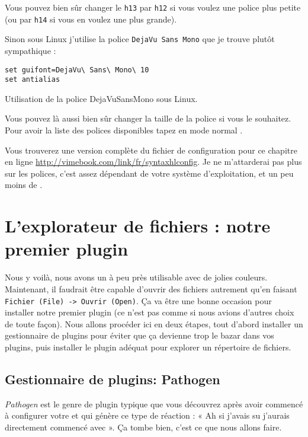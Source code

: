Vous pouvez bien sûr changer le \Verb|h13| par \Verb|h12| si vous voulez une police plus petite (ou par \Verb|h14| si vous en voulez une plus grande).

Sinon sous Linux j'utilise la police \Verb|DejaVu Sans Mono| que je trouve plutôt sympathique :

\begin{listing}[H]
\begin{verbatim}
set guifont=DejaVu\ Sans\ Mono\ 10
set antialias
\end{verbatim}
  \caption{Utilisation de la police DejaVuSansMono sous Linux.}
  \label{lst:dejavusansmono}
\end{listing}

Vous pouvez là aussi bien sûr changer la taille de la police si vous le souhaitez. Pour avoir la liste des polices disponibles tapez en mode normal .

Vous trouverez une version complète du fichier de configuration pour ce chapitre en ligne \url{http://vimebook.com/link/fr/syntaxhlconfig}. Je ne m'attarderai pas plus sur les polices, c'est assez dépendant de votre système d'exploitation, et un peu moins de \vim.


\section{L'explorateur de fichiers : notre premier plugin}

Nous y voilà, nous avons un \vim à peu près utilisable avec de jolies couleurs. Maintenant, il faudrait être capable d'ouvrir des fichiers autrement qu'en faisant \Verb|Fichier (File) -> Ouvrir (Open)|. Ça va être une bonne occasion pour installer notre premier plugin (ce n'est pas comme si nous avions d'autres choix de toute façon). Nous allons procéder ici en deux étapes, tout d'abord installer un gestionnaire de plugins pour éviter que ça devienne trop le bazar dans vos plugins, puis installer le plugin adéquat pour explorer un répertoire de fichiers.

\subsection{Gestionnaire de plugins: Pathogen}

\emph{Pathogen} est le genre de plugin typique que vous découvrez après avoir commencé à configurer votre \vim et qui génère ce type de réaction : « Ah si j'avais su j'aurais directement commencé avec ». Ça tombe bien, c'est ce que nous allons faire.

